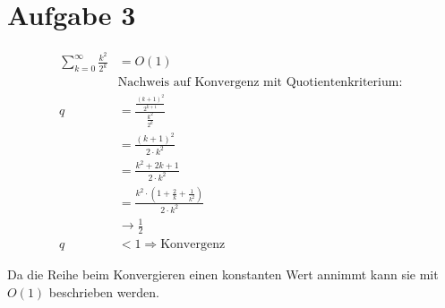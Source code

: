 \section*{Aufgabe 3}
	\begin{align*}
    	\sum_{k=0}^\infty \frac{k^2}{2^k} &= O(1) \\
        &\text{Nachweis auf Konvergenz mit Quotientenkriterium: } \\[0.5cm]
        q &= \frac{\frac{(k + 1)^2}{2^{k + 1}}}{\frac{k^2}{2^k}} \\
        &= \frac{(k + 1)^2}{2 \cdot k^2} \\
        &= \frac{k^2 + 2k + 1}{2 \cdot k^2} \\
        &= \frac{k^2 \cdot (1 + \frac{2}{k} + \frac{1}{k^2})}{2 \cdot k^2} \\
        &\rightarrow \frac{1}{2} \\[0.5cm]
        q &< 1 \Rightarrow \text{Konvergenz}
    \end{align*}
    
    Da die Reihe beim Konvergieren einen konstanten Wert annimmt kann sie mit $O(1)$ beschrieben werden.